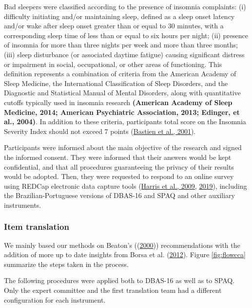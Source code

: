 \documentclass[
  ,doc,11pt, twoside,floatsintext]{apa6}
\begin{document}
Bad sleepers were classified according to the presence of insomnia complaints: (i) difficulty initiating and/or maintaining sleep, defined as a sleep onset latency and/or wake after sleep onset greater than or equal to 30 minutes, with a corresponding sleep time of less than or equal to six hours per night; (ii) presence of insomnia for more than three nights per week and more than three months; (iii) sleep disturbance (or associated daytime fatigue) causing significant distress or impairment in social, occupational, or other areas of functioning. This definition represents a combination of criteria from the American Academy of Sleep Medicine, the International Classification of Sleep Disorders, and the Diagnostic and Statistical Manual of Mental Disorders, along with quantitative cutoffs typically used in insomnia research \textbf{(American Academy of Sleep Medicine, 2014; American Psychiatric Association, 2013; Edinger, et al., 2004)}. In addition to these criteria, participants total score on the Insomnia Severity Index should not exceed 7 points (\protect\hyperlink{ref-bastien2001}{Bastien et al., 2001}).

Participants were informed about the main objective of the research and signed the informed consent. They were informed that their answers would be kept confidential, and that all procedures
guaranteeing the privacy of their results would be adopted. Then, they were requested to respond to an online survey using REDCap electronic data capture tools (\protect\hyperlink{ref-harris2009research}{Harris et al., 2009}, \protect\hyperlink{ref-harris2019redcap}{2019}), including the Brazilian-Portuguese versions of DBAS-16 and SPAQ and other auxiliary instruments.

\hypertarget{item-translation}{%
\subsubsection{Item translation}\label{item-translation}}

We mainly based our methods on Beaton's ((\protect\hyperlink{ref-beaton2000}{2000})) recommendations with the addition of more up to date insights from Borsa et al. (\protect\hyperlink{ref-borsaAdaptacaoValidacaoInstrumentos2012}{2012}). Figure \ref{fig:flowcca} summarize the steps taken in the process.

The following procedures were applied both to DBAS-16 as well as to SPAQ. Only the expert committee and the first translation team had a different configuration for each instrument.
\end{document}
